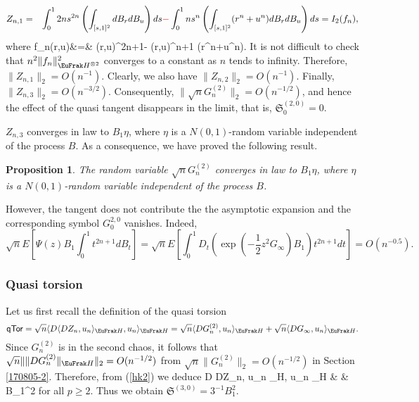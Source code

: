 \documentclass[a4paper]{article}
\newcommand{\colred}{\color[rgb]{0.8,0,0}}
\newcommand{\colred}{\color{black}}%
\numberwithin{equation}{section}
\newtheorem{prop}{Proposition}[section]
\def\mfh{{\EuFrak H}}
\def\HH{\EuFrak H}
\begin{document}
   \begin{eqnarray*}
   Z_{n,1} &=&  \int_0^1 2ns^{2n} \left( \int_{[s,1]^2} dB_r dB_u \right) ds 
  {\colred -} \int_0^1 ns^{n} \left( \int_{[s,1]^2} (r^n+u^n)dB_r dB_u \right) ds= I_2(f_n),
     \end{eqnarray*}
     where
      \beas
     f_n(r,u)&=&  \min(r,u)^{2n+1}-   \min(r,u)^{n+1} (r^n+u^n).
     \eeas
     It is not difficult to check that $n^2\|f_n \|_{\mfh^{\otimes2}}^2$ converges to a constant as $n$ tends to infinity. 
     Therefore, $\|Z_{n,1}\|_2 =O(n^{-1})$.
     Clearly, we also have  $\|Z_{n,2}\|_2=O(n^{-1})$. 
Finally,  $\|Z_{n,3}\|_2=O(n^{-3/2})$. 
Consequently, 
$\|\sqrt{n}G_n^{(2)}\|_2=O(n^{-1/2})$, and hence the effect of the quasi tangent disappears 
in the limit, that is, ${\mathfrak S}^{(2,0)}_0=0$. 


%
\begin{en-text}
$Z_{n,3}$ converges in law to $B_1 \eta$, where $\eta$ is a  $N(0,1)$-random variable independent of the process $B$.
     As a consequence, we have proved the following result.
     
     \begin{prop}
     The random variable $\sqrt{n} G^{(2)}_n$ converges in law to  $B_1 \eta$, where $\eta$ is a  $N(0,1)$-random variable independent of the process $B$.
     \end{prop}
     
     However, the tangent does not contribute the the asymptotic expansion and the corresponding symbol $G^{2,0}_0$ vanishes. Indeed,
     \[
     \sqrt{n} E\left[\Psi(z) B_1 \int_0^1 t^{2n+1} dB_t \right] =\sqrt{n} E\left[  \int_0^1 D_t \left( \exp(-\frac 12 z^2G_\infty) B_1 \right) t^{2n+1} dt \right] =O(n^{-0.5}).
     \]
\end{en-text}
%   
           
     \medskip
     \noindent
\subsubsection{Quasi torsion}\label{170805-3}
Let us first recall the definition of the quasi torsion
    \[
 {\sf qTor} =\sqrt{n}    \langle D \langle DZ_n, u_n \rangle_{\HH}, u_n \rangle_{\HH} =\sqrt{n}  \langle DG^{(2)}_n, u_n \rangle_{\HH} +\sqrt{n}  \langle DG_\infty, u_n \rangle_{\HH}.
     \]
Since $G_n^{(2)}$ is in the second chaos, it follows that 
$\sqrt{n}\|\|DG_n^{(2)}\|_\mfh\|_2=O(n^{-1/2})$ from 
$\sqrt{n}\|G_n^{(2)}\|_2=O(n^{-1/2})$ in Section \ref{170805-2}. 
Therefore, from (\ref{hk2}) we deduce
\beas 
{}\langle D \langle DZ_n, u_n \rangle_{\HH}, u_n \rangle_{\HH}
& {\rightarrow}& 
B_1^2
\eeas
for all $p\ge 2$.
Thus we obtain ${\mathfrak S}^{(3,0)}=3^{-1}B_1^2$.
\end{document}
